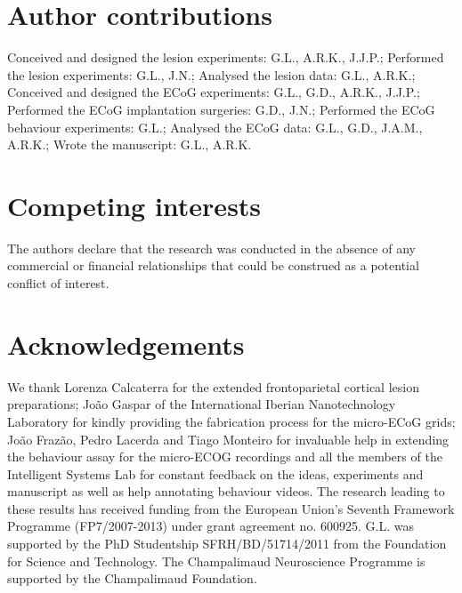 \section{Author contributions}

Conceived and designed the lesion experiments: G.L., A.R.K., J.J.P.; Performed the lesion experiments: G.L., J.N.; Analysed the lesion data: G.L., A.R.K.; Conceived and designed the ECoG experiments: G.L., G.D., A.R.K., J.J.P.; Performed the ECoG implantation surgeries: G.D., J.N.; Performed the ECoG behaviour experiments: G.L.; Analysed the ECoG data: G.L., G.D., J.A.M., A.R.K.; Wrote the manuscript: G.L., A.R.K.

\section{Competing interests}

The authors declare that the research was conducted in the absence of any commercial or financial relationships that could be construed as a potential conflict of interest.

\section{Acknowledgements}

We thank Lorenza Calcaterra for the extended frontoparietal cortical lesion preparations; João Gaspar of the International Iberian Nanotechnology Laboratory for kindly providing the fabrication process for the micro-ECoG grids; João Frazão, Pedro Lacerda and Tiago Monteiro for invaluable help in extending the behaviour assay for the micro-ECOG recordings and all the members of the Intelligent Systems Lab for constant feedback on the ideas, experiments and manuscript as well as help annotating behaviour videos. The research leading to these results has received funding from the European Union's Seventh Framework Programme (FP7/2007-2013) under grant agreement no. 600925. G.L. was supported by the PhD Studentship SFRH/BD/51714/2011 from the Foundation for Science and Technology. The Champalimaud Neuroscience Programme is supported by the Champalimaud Foundation.
